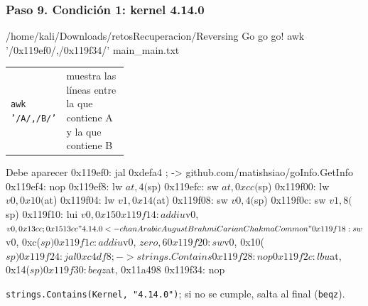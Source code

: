 \documentclass[11pt,a4paper]{article}
\begin{document}
\subsubsection*{Paso 9. Condición 1: kernel 4.14.0}
\begin{comando}{/home/kali/Downloads/retosRecuperacion/Reversing Go go go!}
awk '/0x119ef0/,/0x119f34/' main_main.txt
\end{comando}
\begin{tcolorbox}[enhanced, breakable, colback=gray!3, colframe=gray!35, boxrule=0.3pt, arc=1pt, left=4pt, right=4pt, top=2pt, bottom=2pt, fonttitle=\sffamily\scriptsize\bfseries, coltitle=black!70, colbacktitle=gray!10, title={Qué hace cada parte}, attach title to upper, before skip=2pt, after skip=4pt, fontupper=\small]
\par{\renewcommand{\arraystretch}{1.12}\begin{tabularx}{\linewidth}{@{}>{\raggedright\arraybackslash}p{0.33\linewidth}>{\raggedright\arraybackslash}X@{}}
\texttt{awk '/\allowbreak{}A/\allowbreak{},\allowbreak{}/\allowbreak{}B/\allowbreak{}'} & muestra las líneas entre la que contiene A y la que contiene B \\
\end{tabularx}}
\end{tcolorbox}
\begin{salida}{Debe aparecer}
0x119ef0: jal      0xdefa4  ; -> github.com/matishsiao/goInfo.GetInfo
0x119ef4: nop      
0x119ef8: lw       $at, 4($sp)
0x119efc: sw       $at, 0xcc($sp)
0x119f00: lw       $v0, 0x10($at)
0x119f04: lw       $v1, 0x14($at)
0x119f08: sw       $v0, 4($sp)
0x119f0c: sw       $v1, 8($sp)
0x119f10: lui      $v0, 0x15
0x119f14: addiu    $v0, $v0, 0x13cc  ; 0x1513cc "4.14.0<-chanArabicAugustBrahmiCarianChakmaCommon"
0x119f18: sw       $v0, 0xc($sp)
0x119f1c: addiu    $v0, $zero, 6
0x119f20: sw       $v0, 0x10($sp)
0x119f24: jal      0xc4df8  ; -> strings.Contains
0x119f28: nop      
0x119f2c: lbu      $at, 0x14($sp)
0x119f30: beqz     $at, 0x11a498
0x119f34: nop      
\end{salida}
\begin{nota}\texttt{strings.Contains(Kernel, "4.14.0")}; si no se cumple, salta al final (\texttt{beqz}).\end{nota}
\end{document}

